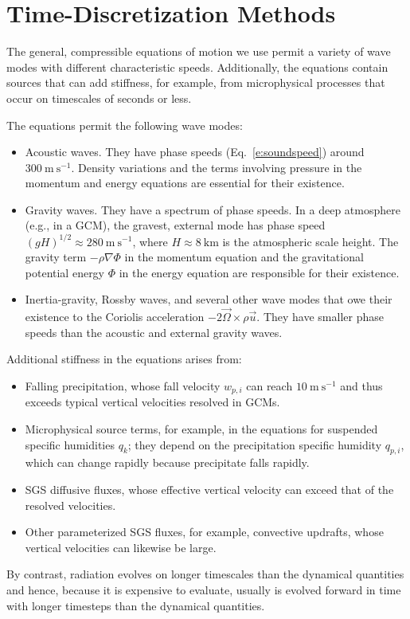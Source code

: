 \documentclass{report}
\begin{document}
{\section{Time-Discretization Methods}\label{s:timestepping}

The general, compressible equations of motion we use permit a variety of wave modes with different characteristic speeds. Additionally, the equations contain sources that can add stiffness, for example, from microphysical processes that occur on timescales of seconds or less.

The equations permit the following wave modes:
\begin{itemize}
    \item Acoustic waves. They have phase speeds (Eq.~\eqref{e:soundspeed}) around $300~\mathrm{m~s^{-1}}$. Density variations and the terms involving pressure in the momentum and energy equations are essential for their existence.
    \item Gravity waves. They have a spectrum of phase speeds. In a deep atmosphere (e.g., in a GCM), the gravest, external mode has phase speed $(gH)^{1/2} \approx 280~\mathrm{m~s^{-1}}$, where $H\approx 8~\mathrm{km}$ is the atmospheric scale height. The gravity term $-\rho \nabla \Phi$ in the momentum equation and the gravitational potential energy $\Phi$ in the energy equation are responsible for their existence.
    \item Inertia-gravity, Rossby waves, and several other wave modes that owe their existence to the Coriolis acceleration $-2\vec{\Omega} \times \rho \vec{u}$. They have smaller phase speeds than the acoustic and external gravity waves.
\end{itemize}
Additional stiffness in the equations arises from:
\begin{itemize}
    \item Falling precipitation, whose fall velocity $w_{p,i}$ can reach $10~\mathrm{m~s^{-1}}$ and thus exceeds typical vertical velocities resolved in GCMs.
    \item Microphysical source terms, for example, in the equations for suspended specific humidities $q_k$; they depend on the precipitation specific humidity $q_{p,i}$, which can change rapidly because precipitate falls rapidly. 
    \item SGS diffusive fluxes, whose effective vertical velocity can exceed that of the resolved velocities.
    \item Other parameterized SGS fluxes, for example, convective updrafts, whose vertical velocities can likewise be large.
\end{itemize}
By contrast, radiation evolves on longer timescales than the dynamical quantities and hence, because it is expensive to evaluate, usually is evolved forward in time with longer timesteps than the dynamical quantities. 

}
\end{document}
